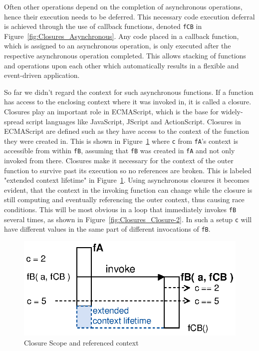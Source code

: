 Often other operations depend on the completion of asynchronous operations, hence their execution needs to be deferred.
This necessary code execution deferral is achieved through the use of callback functions, denoted \texttt{fCB} in Figure~\ref{fig:Closures_Asynchronous}.
Any code placed in a callback function, which is assigned to an asynchronous operation, is only executed after the respective asynchronous operation completed.
This allows stacking of functions and operations upon each other which automatically results in a flexible and event-driven application.

So far we didn't regard the context for such asynchronous functions.
If a function has access to the enclosing context where it was invoked in, it is called a closure.
Closures play an important role in \textrm{ECMAScript}\cite{EcmaScript}, which is the base for widely-spread script languages like JavaScript, JScript and ActionScript.
Closures in \textrm{ECMAScript} are defined such as they have access to the context of the function they were created in.
This is shown in Figure~\ref{fig:Closures_Closure-1} where \texttt{c} from \texttt{fA}'s context is accessible from within \texttt{fB}, assuming that \texttt{fB} was created in \texttt{fA} and not only invoked from there.
Closures make it necessary for the context of the outer function to survive past its execution so no references are broken.
This is labeled "extended context lifetime" in Figure~\ref{fig:Closures_Closure-1}.
Using asynchronous closures it becomes evident, that the context in the invoking function can change while the closure is still computing and eventually referencing the outer context, thus causing race conditions.
This will be most obvious in a loop that immediately invokes \texttt{fB} several times, as shown in Figure~\ref{fig:Closures_Closure-2}.
In such a setup \texttt{c} will have different values in the same part of different invocations of \texttt{fB}.
\begin{figure}[!ht]
	\centering
  \includegraphics{figures/Closures_Closure-1}
	\caption{Closure Scope and referenced context}
	\label{fig:Closures_Closure-1}
\end{figure}
